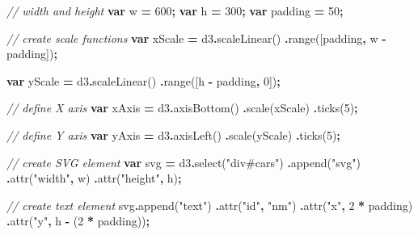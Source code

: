 \documentclass[
  openany]{book}
\newenvironment{Shaded}{\begin{snugshade}}{\end{snugshade}}
\newcommand{\CommentTok}[1]{\textcolor[rgb]{0.56,0.35,0.01}{\textit{#1}}}
\newcommand{\DecValTok}[1]{\textcolor[rgb]{0.00,0.00,0.81}{#1}}
\newcommand{\FunctionTok}[1]{\textcolor[rgb]{0.00,0.00,0.00}{#1}}
\newcommand{\KeywordTok}[1]{\textcolor[rgb]{0.13,0.29,0.53}{\textbf{#1}}}
\newcommand{\NormalTok}[1]{#1}
\newcommand{\OperatorTok}[1]{\textcolor[rgb]{0.81,0.36,0.00}{\textbf{#1}}}
\newcommand{\StringTok}[1]{\textcolor[rgb]{0.31,0.60,0.02}{#1}}
\begin{document}
\begin{Shaded}
\begin{Highlighting}[]
\CommentTok{// width and height}
\KeywordTok{var}\NormalTok{ w }\OperatorTok{=} \DecValTok{600}\OperatorTok{;}
\KeywordTok{var}\NormalTok{ h }\OperatorTok{=} \DecValTok{300}\OperatorTok{;}
\KeywordTok{var}\NormalTok{ padding }\OperatorTok{=} \DecValTok{50}\OperatorTok{;}

\CommentTok{// create scale functions}
\KeywordTok{var}\NormalTok{ xScale }\OperatorTok{=}\NormalTok{ d3}\OperatorTok{.}\FunctionTok{scaleLinear}\NormalTok{()}
  \OperatorTok{.}\FunctionTok{range}\NormalTok{([padding}\OperatorTok{,}\NormalTok{ w }\OperatorTok{{-}}\NormalTok{ padding])}\OperatorTok{;}

\KeywordTok{var}\NormalTok{ yScale }\OperatorTok{=}\NormalTok{ d3}\OperatorTok{.}\FunctionTok{scaleLinear}\NormalTok{()}
  \OperatorTok{.}\FunctionTok{range}\NormalTok{([h }\OperatorTok{{-}}\NormalTok{ padding}\OperatorTok{,} \DecValTok{0}\NormalTok{])}\OperatorTok{;}

\CommentTok{// define X axis}
\KeywordTok{var}\NormalTok{ xAxis }\OperatorTok{=}\NormalTok{ d3}\OperatorTok{.}\FunctionTok{axisBottom}\NormalTok{()}
  \OperatorTok{.}\FunctionTok{scale}\NormalTok{(xScale)}
  \OperatorTok{.}\FunctionTok{ticks}\NormalTok{(}\DecValTok{5}\NormalTok{)}\OperatorTok{;}

\CommentTok{// define Y axis}
\KeywordTok{var}\NormalTok{ yAxis }\OperatorTok{=}\NormalTok{ d3}\OperatorTok{.}\FunctionTok{axisLeft}\NormalTok{()}
  \OperatorTok{.}\FunctionTok{scale}\NormalTok{(yScale)}
  \OperatorTok{.}\FunctionTok{ticks}\NormalTok{(}\DecValTok{5}\NormalTok{)}\OperatorTok{;}

\CommentTok{// create SVG element}
\KeywordTok{var}\NormalTok{ svg }\OperatorTok{=}\NormalTok{ d3}\OperatorTok{.}\FunctionTok{select}\NormalTok{(}\StringTok{"div\#cars"}\NormalTok{)}
  \OperatorTok{.}\FunctionTok{append}\NormalTok{(}\StringTok{"svg"}\NormalTok{)}
  \OperatorTok{.}\FunctionTok{attr}\NormalTok{(}\StringTok{"width"}\OperatorTok{,}\NormalTok{ w)}
  \OperatorTok{.}\FunctionTok{attr}\NormalTok{(}\StringTok{"height"}\OperatorTok{,}\NormalTok{ h)}\OperatorTok{;}

\CommentTok{// create text element}
\NormalTok{svg}\OperatorTok{.}\FunctionTok{append}\NormalTok{(}\StringTok{"text"}\NormalTok{)}
  \OperatorTok{.}\FunctionTok{attr}\NormalTok{(}\StringTok{"id"}\OperatorTok{,} \StringTok{"nm"}\NormalTok{)}
  \OperatorTok{.}\FunctionTok{attr}\NormalTok{(}\StringTok{"x"}\OperatorTok{,} \DecValTok{2} \OperatorTok{*}\NormalTok{ padding)}
  \OperatorTok{.}\FunctionTok{attr}\NormalTok{(}\StringTok{"y"}\OperatorTok{,}\NormalTok{ h }\OperatorTok{{-}}\NormalTok{ (}\DecValTok{2} \OperatorTok{*}\NormalTok{ padding))}\OperatorTok{;}


\end{Highlighting}
\end{Shaded}
\end{document}
